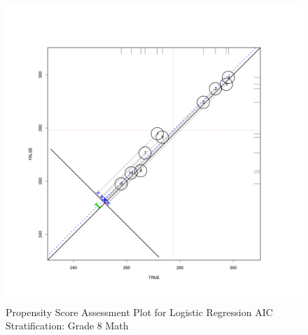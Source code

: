 \documentclass[letterpaper,12p,twoside]{article} %
\begin{document}
\clearpage
\begin{figure}
\begin{center}
\includegraphics[height=.4\textheight,width=.4\textheight]{../Figures2009/g8math-circpsa10-AIC.pdf}
\caption{Propensity Score Assessment Plot for Logistic Regression AIC Stratification: Grade 8 Math}
\end{center}
\end{figure}


\end{document}
